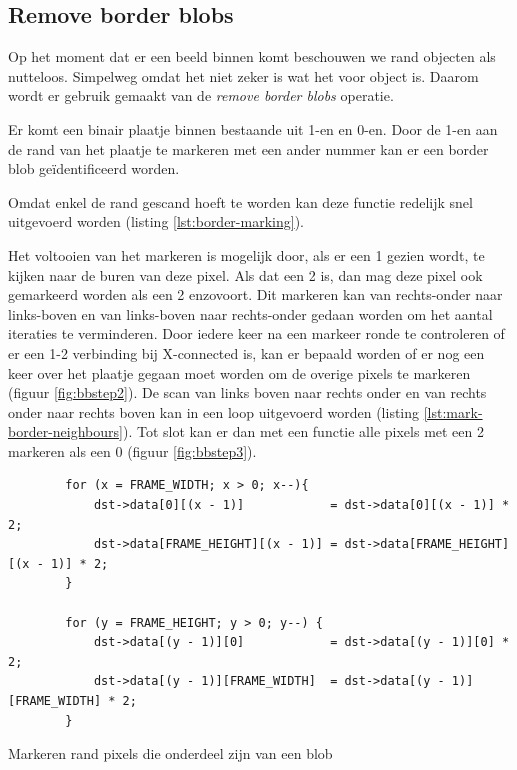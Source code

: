 \subsection{Remove border blobs}

Op het moment dat er een beeld binnen komt beschouwen we rand objecten als
nutteloos. Simpelweg omdat het niet zeker is wat het voor object is. Daarom
wordt er gebruik gemaakt van de \emph{remove border blobs} operatie.

Er komt een binair plaatje binnen bestaande uit 1-en en 0-en. Door de 1-en
aan de rand van het plaatje te markeren met een ander nummer kan er een
border blob geïdentificeerd worden.

Omdat enkel de rand gescand hoeft te worden kan deze functie redelijk snel
uitgevoerd worden (listing \ref{lst:border-marking}).

Het voltooien van het markeren is mogelijk door, als er een 1 gezien wordt,
te kijken naar de buren van deze pixel. Als dat een 2 is, dan mag deze pixel
ook gemarkeerd worden als een 2 enzovoort. Dit markeren kan van rechts-onder
naar links-boven en van links-boven naar rechts-onder gedaan worden om het
aantal iteraties te verminderen. Door iedere keer na een markeer ronde te
controleren of er een 1-2 verbinding bij X-connected is, kan er bepaald worden
of er nog een keer over het plaatje gegaan moet worden om de overige pixels te
markeren (figuur \ref{fig:bbstep2}). De scan van links boven naar rechts onder
en van rechts onder naar rechts boven kan in een loop uitgevoerd worden (listing
\ref{lst:mark-border-neighbours}). Tot slot kan er dan met een functie alle
pixels met een 2 markeren als een 0 (figuur \ref{fig:bbstep3}).


\begin{listing}
    \begin{verbatim}
        for (x = FRAME_WIDTH; x > 0; x--){
            dst->data[0][(x - 1)]            = dst->data[0][(x - 1)] * 2;
            dst->data[FRAME_HEIGHT][(x - 1)] = dst->data[FRAME_HEIGHT][(x - 1)] * 2;
        }

        for (y = FRAME_HEIGHT; y > 0; y--) {
            dst->data[(y - 1)][0]            = dst->data[(y - 1)][0] * 2;
            dst->data[(y - 1)][FRAME_WIDTH]  = dst->data[(y - 1)][FRAME_WIDTH] * 2;
        }
    \end{verbatim}
    \caption{Markeren rand pixels die onderdeel zijn van een blob}
    \label{lst:border-marking}
\end{listing}

